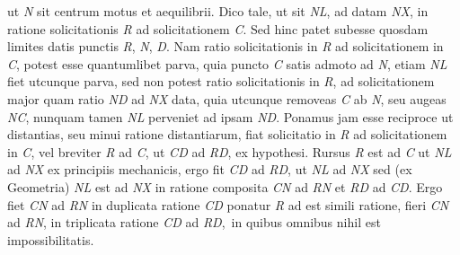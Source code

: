 ut \textit{N} sit centrum motus et aequilibrii. Dico 
tale, ut sit \textit{NL}, ad datam \textit{NX}, in ratione solicitationis \textit{R} ad solicitationem \textit{C}. 
Sed hinc patet subesse quosdam limites datis punctis \textit{R}, \textit{N}, \textit{D}. 
Nam ratio solicitationis in \textit{R} ad solicitationem in \textit{C}, 
potest esse quantumlibet parva, quia puncto \textit{C} satis admoto ad \textit{N}, etiam \textit{NL} fiet utcunque 
parva, sed non potest ratio solicitationis in \textit{R}, ad solicitationem 
major quam ratio \textit{ND} ad \textit{NX} data, quia utcunque removeas \textit{C} ab \textit{N}, seu augeas \textit{NC}, nunquam tamen \textit{NL} perveniet ad ipsam \textit{ND}. Ponamus jam 
esse reciproce ut distantias, seu minui ratione distantiarum, 
fiat solicitatio in \textit{R} ad solicitationem in \textit{C}, vel breviter \textit{R} ad \textit{C}, ut \textit{CD} ad \textit{RD}, ex hypothesi. 
Rursus \textit{R} est ad \textit{C} ut \textit{NL} ad \textit{NX} ex principiis mechanicis,
ergo fit \textit{CD} ad \textit{RD}, ut \textit{NL} ad \textit{NX} sed (ex Geometria) 
\textit{NL} est ad \textit{NX} in ratione composita \textit{CN} ad \textit{RN} et \textit{RD} ad \textit{CD}. 
Ergo fiet \textit{CN} ad \textit{RN} in duplicata ratione \textit{CD} 
ponatur \textit{R} ad 
est simili ratione, fieri \textit{CN} ad \textit{RN}, in triplicata ratione \textit{CD} ad \textit{RD}\lbrack,\rbrack\ in quibus omnibus nihil est impossibilitatis.
\pend 
\normalsize
